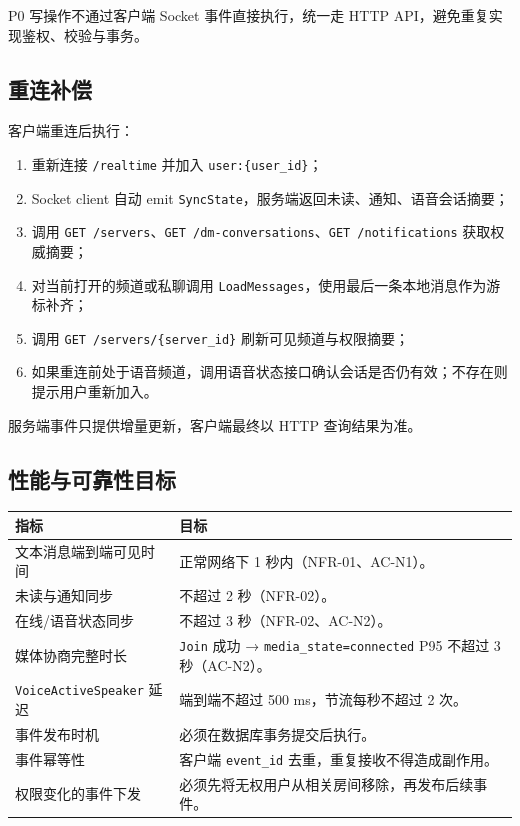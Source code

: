 P0 写操作不通过客户端 Socket 事件直接执行，统一走 HTTP API，避免重复实现鉴权、校验与事务。

\subsection{重连补偿}

客户端重连后执行：

\begin{enumerate}
  \item 重新连接 \texttt{/realtime} 并加入 \texttt{user:\{user\_id\}}；
  \item Socket client 自动 emit \texttt{SyncState}，服务端返回未读、通知、语音会话摘要；
  \item 调用 \texttt{GET /servers}、\texttt{GET /dm-conversations}、\texttt{GET /notifications} 获取权威摘要；
  \item 对当前打开的频道或私聊调用 \texttt{LoadMessages}，使用最后一条本地消息作为游标补齐；
  \item 调用 \texttt{GET /servers/\{server\_id\}} 刷新可见频道与权限摘要；
  \item 如果重连前处于语音频道，调用语音状态接口确认会话是否仍有效；不存在则提示用户重新加入。
\end{enumerate}

服务端事件只提供增量更新，客户端最终以 HTTP 查询结果为准。

\subsection{性能与可靠性目标}

\noindent\begin{tabularx}{\textwidth}{L{4.4cm}Y}
  \toprule
  指标 & 目标 \\
  \midrule
  文本消息端到端可见时间 & 正常网络下 1 秒内（NFR-01、AC-N1）。 \\
  未读与通知同步 & 不超过 2 秒（NFR-02）。 \\
  在线/语音状态同步 & 不超过 3 秒（NFR-02、AC-N2）。 \\
  媒体协商完整时长 & \texttt{Join} 成功 → \texttt{media\_state=connected} P95 不超过 3 秒（AC-N2）。 \\
  \texttt{VoiceActiveSpeaker} 延迟 & 端到端不超过 500 ms，节流每秒不超过 2 次。 \\
  事件发布时机 & 必须在数据库事务提交后执行。 \\
  事件幂等性 & 客户端 \texttt{event\_id} 去重，重复接收不得造成副作用。 \\
  权限变化的事件下发 & 必须先将无权用户从相关房间移除，再发布后续事件。 \\
  \bottomrule
\end{tabularx}

